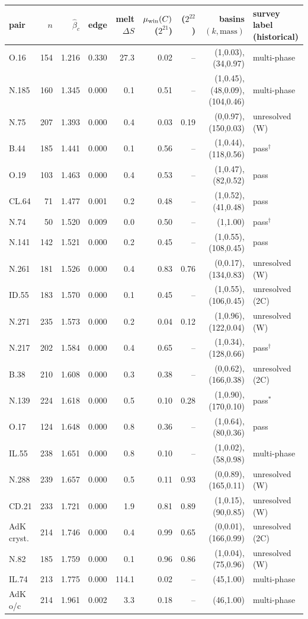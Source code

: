 \begin{tabular}{lrrrrrrrl}
\toprule
pair & $n$ & $\hat\beta_c$ & edge & melt $\Delta S$ & $\mu_{\rm win}(C)$ ($2^{21}$) & ($2^{22}$) & basins $(k,\text{mass})$ & survey label (historical) \\
\midrule
O.16 & 154 & 1.216 & 0.330 & 27.3 & 0.02 & -- & (1,0.03), (34,0.97) & multi-phase \\
N.185 & 160 & 1.345 & 0.000 & 0.1 & 0.51 & -- & (1,0.45), (48,0.09), (104,0.46) & multi-phase \\
N.75 & 207 & 1.393 & 0.000 & 0.4 & 0.03 & 0.19 & (0,0.97), (150,0.03) & unresolved (W) \\
B.44 & 185 & 1.441 & 0.000 & 0.1 & 0.56 & -- & (1,0.44), (118,0.56) & pass$^\dagger$ \\
O.19 & 103 & 1.463 & 0.000 & 0.4 & 0.53 & -- & (1,0.47), (82,0.52) & pass \\
CL.64 & 71 & 1.477 & 0.001 & 0.2 & 0.48 & -- & (1,0.52), (41,0.48) & pass \\
N.74 & 50 & 1.520 & 0.009 & 0.0 & 0.50 & -- & (1,1.00) & pass$^\dagger$ \\
N.141 & 142 & 1.521 & 0.000 & 0.2 & 0.45 & -- & (1,0.55), (108,0.45) & pass \\
N.261 & 181 & 1.526 & 0.000 & 0.4 & 0.83 & 0.76 & (0,0.17), (134,0.83) & unresolved (W) \\
ID.55 & 183 & 1.570 & 0.000 & 0.1 & 0.45 & -- & (1,0.55), (106,0.45) & unresolved (2C) \\
N.271 & 235 & 1.573 & 0.000 & 0.2 & 0.04 & 0.12 & (1,0.96), (122,0.04) & unresolved (W) \\
N.217 & 202 & 1.584 & 0.000 & 0.4 & 0.65 & -- & (1,0.34), (128,0.66) & pass$^\dagger$ \\
B.38 & 210 & 1.608 & 0.000 & 0.3 & 0.38 & -- & (0,0.62), (166,0.38) & unresolved (2C) \\
N.139 & 224 & 1.618 & 0.000 & 0.5 & 0.10 & 0.28 & (1,0.90), (170,0.10) & pass$^\ast$ \\
O.17 & 124 & 1.648 & 0.000 & 0.8 & 0.36 & -- & (1,0.64), (80,0.36) & pass \\
IL.55 & 238 & 1.651 & 0.000 & 0.8 & 0.10 & -- & (1,0.02), (58,0.98) & multi-phase \\
N.288 & 239 & 1.657 & 0.000 & 0.5 & 0.11 & 0.93 & (0,0.89), (165,0.11) & unresolved (W) \\
CD.21 & 233 & 1.721 & 0.000 & 1.9 & 0.81 & 0.89 & (1,0.15), (90,0.85) & unresolved (W) \\
AdK cryst. & 214 & 1.746 & 0.000 & 0.4 & 0.99 & 0.65 & (0,0.01), (166,0.99) & unresolved (2C) \\
N.82 & 185 & 1.759 & 0.000 & 0.1 & 0.96 & 0.86 & (1,0.04), (75,0.96) & unresolved (W) \\
IL.74 & 213 & 1.775 & 0.000 & 114.1 & 0.02 & -- & (45,1.00) & multi-phase \\
AdK o/c & 214 & 1.961 & 0.002 & 3.3 & 0.18 & -- & (46,1.00) & multi-phase \\
\bottomrule
\end{tabular}
